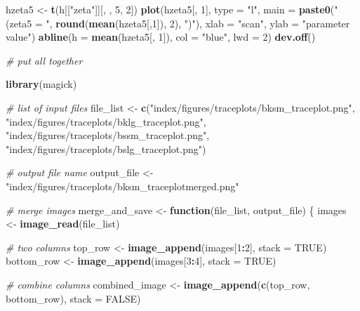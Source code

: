 \documentclass[12pt, twoside]{amherstthesis}
\newenvironment{Shaded}{\begin{snugshade}}{\end{snugshade}}
\newcommand{\AttributeTok}[1]{\textcolor[rgb]{0.13,0.29,0.53}{#1}}
\newcommand{\CommentTok}[1]{\textcolor[rgb]{0.56,0.35,0.01}{\textit{#1}}}
\newcommand{\ConstantTok}[1]{\textcolor[rgb]{0.56,0.35,0.01}{#1}}
\newcommand{\ControlFlowTok}[1]{\textcolor[rgb]{0.13,0.29,0.53}{\textbf{#1}}}
\newcommand{\DecValTok}[1]{\textcolor[rgb]{0.00,0.00,0.81}{#1}}
\newcommand{\FunctionTok}[1]{\textcolor[rgb]{0.13,0.29,0.53}{\textbf{#1}}}
\newcommand{\NormalTok}[1]{#1}
\newcommand{\OtherTok}[1]{\textcolor[rgb]{0.56,0.35,0.01}{#1}}
\newcommand{\SpecialCharTok}[1]{\textcolor[rgb]{0.81,0.36,0.00}{\textbf{#1}}}
\newcommand{\StringTok}[1]{\textcolor[rgb]{0.31,0.60,0.02}{#1}}
\begin{document}
\begin{Shaded}
\begin{Highlighting}[]
\NormalTok{hzeta5 }\OtherTok{\textless{}{-}} \FunctionTok{t}\NormalTok{(h[[}\StringTok{"zeta"}\NormalTok{]][, , }\DecValTok{5}\NormalTok{, }\DecValTok{2}\NormalTok{])}
\FunctionTok{plot}\NormalTok{(hzeta5[, }\DecValTok{1}\NormalTok{], }\AttributeTok{type =} \StringTok{"l"}\NormalTok{, }
     \AttributeTok{main =} \FunctionTok{paste0}\NormalTok{(}\StringTok{"(zeta5 = "}\NormalTok{, }\FunctionTok{round}\NormalTok{(}\FunctionTok{mean}\NormalTok{(hzeta5[,}\DecValTok{1}\NormalTok{]), }\DecValTok{2}\NormalTok{), }\StringTok{")"}\NormalTok{), }
     \AttributeTok{xlab =} \StringTok{"scan"}\NormalTok{, }\AttributeTok{ylab =} \StringTok{"parameter value"}\NormalTok{)}
\FunctionTok{abline}\NormalTok{(}\AttributeTok{h =} \FunctionTok{mean}\NormalTok{(hzeta5[, }\DecValTok{1}\NormalTok{]), }\AttributeTok{col =} \StringTok{"blue"}\NormalTok{, }\AttributeTok{lwd =} \DecValTok{2}\NormalTok{)}
\FunctionTok{dev.off}\NormalTok{()}

\CommentTok{\# put all together}

\FunctionTok{library}\NormalTok{(magick)}

\CommentTok{\# list of input files}
\NormalTok{file\_list }\OtherTok{\textless{}{-}} \FunctionTok{c}\NormalTok{(}\StringTok{"index/figures/traceplots/bksm\_traceplot.png"}\NormalTok{, }
               \StringTok{"index/figures/traceplots/bklg\_traceplot.png"}\NormalTok{, }
               \StringTok{"index/figures/traceplots/bssm\_traceplot.png"}\NormalTok{, }
               \StringTok{"index/figures/traceplots/bslg\_traceplot.png"}\NormalTok{)}

\CommentTok{\# output file name}
\NormalTok{output\_file }\OtherTok{\textless{}{-}} \StringTok{"index/figures/traceplots/bksm\_traceplotmerged.png"}

\CommentTok{\# merge images}
\NormalTok{merge\_and\_save }\OtherTok{\textless{}{-}} \ControlFlowTok{function}\NormalTok{(file\_list, output\_file) \{}
\NormalTok{  images }\OtherTok{\textless{}{-}} \FunctionTok{image\_read}\NormalTok{(file\_list)}
  
  \CommentTok{\# two columns}
\NormalTok{  top\_row }\OtherTok{\textless{}{-}} \FunctionTok{image\_append}\NormalTok{(images[}\DecValTok{1}\SpecialCharTok{:}\DecValTok{2}\NormalTok{], }\AttributeTok{stack =} \ConstantTok{TRUE}\NormalTok{)}
\NormalTok{  bottom\_row }\OtherTok{\textless{}{-}} \FunctionTok{image\_append}\NormalTok{(images[}\DecValTok{3}\SpecialCharTok{:}\DecValTok{4}\NormalTok{], }\AttributeTok{stack =} \ConstantTok{TRUE}\NormalTok{)}
  
  \CommentTok{\# combine columns}
\NormalTok{  combined\_image }\OtherTok{\textless{}{-}} \FunctionTok{image\_append}\NormalTok{(}\FunctionTok{c}\NormalTok{(top\_row, bottom\_row), }\AttributeTok{stack =} \ConstantTok{FALSE}\NormalTok{)}
  

\end{Highlighting}
\end{Shaded}
\end{document}
